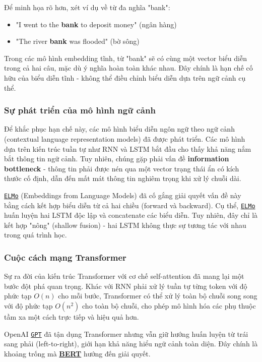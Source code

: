     Để minh họa rõ hơn, xét ví dụ về từ đa nghĩa "bank":
    \begin{itemize}
        \item "I went to the \textbf{bank} to deposit money" (ngân hàng)
        \item "The river \textbf{bank} was flooded" (bờ sông)
    \end{itemize}
    
    Trong các mô hình embedding tĩnh, từ "bank" sẽ có cùng một vector biểu diễn trong cả hai câu, mặc dù ý nghĩa hoàn toàn khác nhau. Đây chính là hạn chế cố hữu của biểu diễn tĩnh - không thể điều chỉnh biểu diễn dựa trên ngữ cảnh cụ thể.
    
    \subsubsection{Sự phát triển của mô hình ngữ cảnh}
    Để khắc phục hạn chế này, các mô hình biểu diễn ngôn ngữ theo ngữ cảnh (contextual language representation models) đã được phát triển. Các mô hình dựa trên kiến trúc tuần tự như RNN và LSTM bắt đầu cho thấy khả năng nắm bắt thông tin ngữ cảnh. Tuy nhiên, chúng gặp phải vấn đề \textbf{information bottleneck} - thông tin phải được nén qua một vector trạng thái ẩn có kích thước cố định, dẫn đến mất mát thông tin nghiêm trọng khi xử lý chuỗi dài.
    
    \hyperref[acro:elmo]{\texttt{ELMo}} (Embeddings from Language Models) \cite{peters2018deep} đã cố gắng giải quyết vấn đề này bằng cách kết hợp biểu diễn từ cả hai chiều (forward và backward). Cụ thể, \hyperref[acro:elmo]{\texttt{ELMo}} huấn luyện hai LSTM độc lập và concatenate các biểu diễn. Tuy nhiên, đây chỉ là kết hợp "nông" (shallow fusion) - hai LSTM không thực sự tương tác với nhau trong quá trình học.
    
    \subsubsection{Cuộc cách mạng Transformer}
    Sự ra đời của kiến trúc Transformer \cite{vaswani2017attention} với cơ chế self-attention đã mang lại một bước đột phá quan trọng. Khác với RNN phải xử lý tuần tự từng token với độ phức tạp $O(n)$ cho mỗi bước, Transformer có thể xử lý toàn bộ chuỗi song song với độ phức tạp $O(n^2)$ cho toàn bộ chuỗi, cho phép mô hình hóa các phụ thuộc tầm xa một cách trực tiếp và hiệu quả hơn.
    
    OpenAI \hyperref[acro:gpt]{\texttt{GPT}} \cite{radford2018improving} đã tận dụng Transformer nhưng vẫn giữ hướng huấn luyện từ trái sang phải (left-to-right), giới hạn khả năng hiểu ngữ cảnh toàn diện. Đây chính là khoảng trống mà \hyperref[acro:bert]{\textbf{BERT}} hướng đến giải quyết.
    
